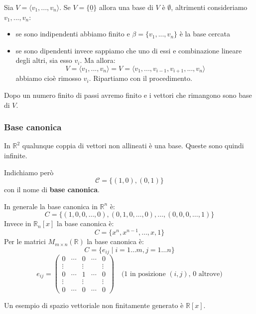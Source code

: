 \documentclass[
  a4paper,
]{article}
\providecommand{\tightlist}{%
  \setlength{\itemsep}{0pt}\setlength{\parskip}{0pt}}
\providecommand{\tightlist}{}
\begin{document}
\begin{proofbox}
Sia \(V = \langle v_1, ..., v_n \rangle\). Se \(V = \{\underline 0\}\)
allora una base di \(V\) è \(\emptyset\), altrimenti consideriamo
\(v_1, ..., v_n\):

\begin{itemize}
\tightlist
\item
  se sono indipendenti abbiamo finito e \(\beta = \{v_1, ..., v_n\}\) è
  la base cercata
\item
  se sono dipendenti invece sappiamo che uno di essi e combinazione
  lineare degli altri, sia esso \(v_i\). Ma allora: \[
  V = \langle v_1, ..., v_n \rangle = V = \langle v_1, ..., v_{i-1}, v_{i+1}, ...,  v_n \rangle
  \] abbiamo cioè rimosso \(v_i\). Ripartiamo con il procedimento.
\end{itemize}

Dopo un numero finito di passi avremo finito e i vettori che rimangono
sono base di \(V\).
\end{proofbox}

\hypertarget{base-canonica}{%
\subsubsection{Base canonica}\label{base-canonica}}

In \(\mathbb{R}^2\) qualunque coppia di vettori non allineati è una
base. Queste sono quindi infinite.

Indichiamo però \[
\mathcal{C} = \{(1, 0), (0,1)\}
\] con il nome di \textbf{base canonica}.

In generale la base canonica in \(\mathbb{R}^n\) è: \[
C = \{(1, 0, 0, \dots, 0), (0, 1, 0, \dots, 0), \dots, (0, 0, 0, \dots, 1)\}
\] Invece in \(\mathbb{R}_n [x]\) la base canonica è: \[
C = \{x^n, x^{n-1}, \dots, x, 1\}
\] Per le matrici \(M_{m\times n}(\mathbb{R})\) la base canonica è: \[
C = \{e_{ij} \mid i= 1\dots m, j = 1 \dots n\}
\] \[
e_{ij} = 
\begin{pmatrix}  
0 & \cdots & 0 & \cdots & 0 \\  
\vdots & & \vdots & & \vdots \\  
0 & \cdots & 1 & \cdots & 0 \\  
\vdots & & \vdots & & \vdots \\  
0 & \cdots & 0 & \cdots & 0  
\end{pmatrix}  
\quad \text{(1 in posizione $(i,j)$, 0 altrove)}
\]

\begin{notebox}
Un esempio di spazio vettoriale non finitamente generato è
\(\mathbb{R} [x]\).
\end{notebox}
\end{document}
